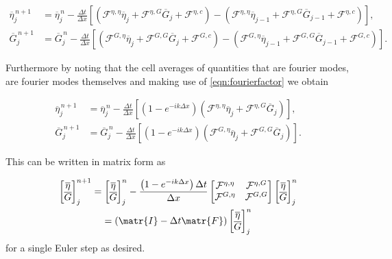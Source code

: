 \begin{align*}
\overline{\eta}_{j}^{\,n + 1} &=  \overline{\eta}^{\,n }_{j} - \frac{\Delta t}{\Delta x}  \left[ \left(\mathcal{F}^{\eta,\eta} \overline{\eta}_j  + \mathcal{F}^{\eta,G} \overline{G}_j + \mathcal{F}^{\eta,c} \right) - \left(\mathcal{F}^{\eta,\eta} \overline{\eta}_{j-1}  + \mathcal{F}^{\eta,G} \overline{G}_{j-1} + \mathcal{F}^{\eta,c} \right)  \right], \\
 \overline{G}^{\,n + 1}_{j} &= \overline{G}^{\,n }_{j} -\frac{\Delta t}{\Delta x}  \left[ \left(  \mathcal{F}^{G,\eta} \overline{\eta}_{j}  + \mathcal{F}^{G,G} \overline{G}_j + \mathcal{F}^{G,c} \right) - \left(  \mathcal{F}^{G,\eta} \overline{\eta}_{j-1}  + \mathcal{F}^{G,G} \overline{G}_{j-1} + \mathcal{F}^{G,c} \right) \right].
\end{align*}

	
Furthermore by noting that the cell averages of quantities that are fourier modes, are fourier modes themselves and making use of \eqref{eqn:fourierfactor} we obtain
	
\begin{align*}
\overline{\eta}_{j}^{\,n + 1} &=  \overline{\eta}^{\,n }_{j} - \frac{\Delta t}{\Delta x}  \left[ \left(1 - e^{-ik\Delta x}\right) \left(\mathcal{F}^{\eta,\eta} \overline{\eta}_j  + \mathcal{F}^{\eta,G} \overline{G}_j \right) \right], \\
\overline{G}^{\,n + 1}_{j} &= \overline{G}^{\,n }_{j} -\frac{\Delta t}{\Delta x}  \left[ \left(1 - e^{-ik\Delta x}\right)\left(  \mathcal{F}^{G,\eta} \overline{\eta}_{j}  + \mathcal{F}^{G,G} \overline{G}_j \right) \right].
\end{align*}


This can be written in matrix form as

\begin{multline}
\label{eqn:singleEvolveStep}
\begin{bmatrix}
\overline{\eta} \\ \overline{G}
\end{bmatrix}^{n+1}_j = \begin{bmatrix}
\overline{\eta} \\ \overline{G}
\end{bmatrix}^{n}_j - \frac{\left(1 - e^{-ik\Delta x}\right) \Delta t}{ \Delta x}\begin{bmatrix}
\mathcal{F}^{\eta,\eta} & \mathcal{F}^{\eta,G} \\\mathcal{F}^{G,\eta} &\mathcal{F}^{G,G} 
\end{bmatrix}\begin{bmatrix}
\overline{\eta} \\ \overline{G}
\end{bmatrix}^{n}_j \\= \left(\matr{I}  - \Delta t \matr{F} \right) \begin{bmatrix}
\overline{\eta} \\ \overline{G}
\end{bmatrix}^{n}_j
\end{multline}
for a single Euler step as desired.

